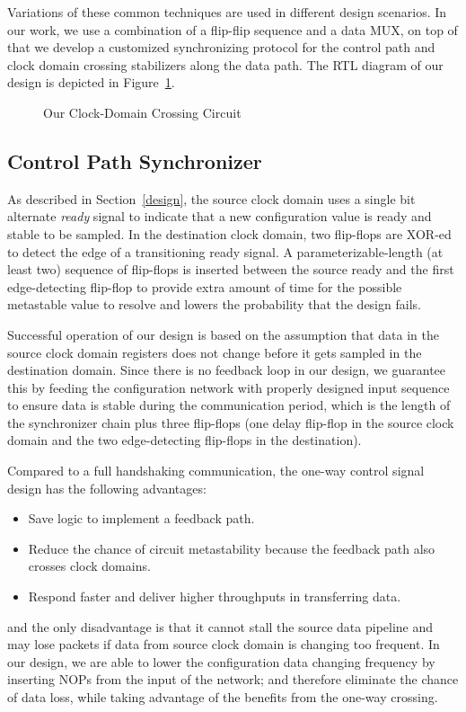 \documentclass[12pt]{article}
\newcommand{\reffig}[1]{Figure~\ref{#1}}
\newcommand{\refsec}[1]{Section~\ref{#1}}
\begin{document}
Variations of these common techniques are used in different design scenarios.
In our work, we use a combination of a flip-flip sequence and a data MUX, on
top of that we develop a customized synchronizing protocol for the control path
and clock domain crossing stabilizers along the data path. The RTL diagram of
our design is depicted in \reffig{fig:our-cdc}.

\begin{figure}
\centering

\caption{Our Clock-Domain Crossing Circuit}
\label{fig:our-cdc}
\end{figure}

\subsection{Control Path Synchronizer} \label{control}
As described in \refsec{design}, the source clock domain uses a single bit
alternate \textit{ready} signal to indicate that a new configuration value is
ready and stable to be sampled. In the destination clock domain, two flip-flops
are XOR-ed to detect the edge of a transitioning ready signal. A
parameterizable-length (at least two) sequence of flip-flops is inserted
between the source ready and the first edge-detecting flip-flop to provide
extra amount of time for the possible metastable value to resolve and lowers
the probability that the design fails. %

Successful operation of our design is based on the assumption that data in the
source clock domain registers does not change before it gets sampled in the
destination domain. Since there is no feedback loop in our design, we guarantee
this by feeding the configuration network with properly designed input sequence
to ensure data is stable during the communication period, which is the length
of the synchronizer chain plus three flip-flops (one delay flip-flop in the
source clock domain and the two edge-detecting flip-flops in the destination).

Compared to a full handshaking communication, the one-way control signal design
has the following advantages:
\begin{itemize}
\item Save logic to implement a feedback path.
\item Reduce the chance of circuit metastability because the feedback path also
      crosses clock domains.
\item Respond faster and deliver higher throughputs in transferring data.
\end{itemize}
and the only disadvantage is that it cannot stall the source data pipeline and
may lose packets if data from source clock domain is changing too frequent.
In our design, we are able to lower the configuration data changing frequency
by inserting NOPs from the input of the network; and therefore eliminate the
chance of data loss, while taking advantage of the benefits from the one-way
crossing.
\end{document}
